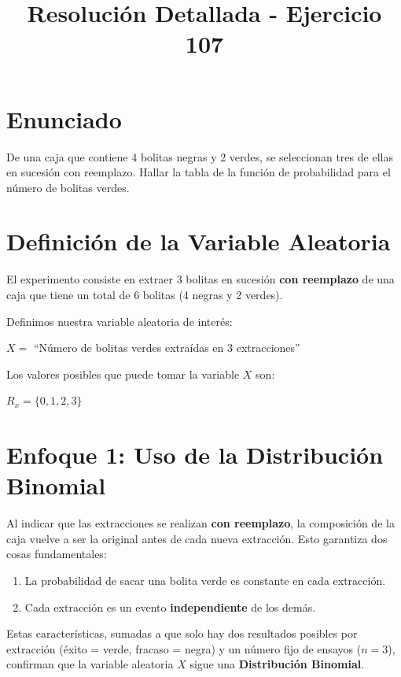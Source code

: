 \documentclass[a4paper,12pt]{article}
\title{\textbf{Resolución Detallada - Ejercicio 107}}
\author{}
\date{}
\begin{document}
\maketitle

\section*{Enunciado}
De una caja que contiene 4 bolitas negras y 2 verdes, se seleccionan tres de ellas en sucesión con reemplazo. Hallar la tabla de la función de probabilidad para el número de bolitas verdes.

\vspace{0.5cm}

\section*{Definición de la Variable Aleatoria}
El experimento consiste en extraer 3 bolitas en sucesión \textbf{con reemplazo} de una caja que tiene un total de 6 bolitas (4 negras y 2 verdes).

Definimos nuestra variable aleatoria de interés:
\begin{center}
    $X =$ ``Número de bolitas verdes extraídas en 3 extracciones''
\end{center}

Los valores posibles que puede tomar la variable $X$ son:
\begin{center}
    $R_x = \{0, 1, 2, 3\}$
\end{center}

\vspace{0.5cm}

\section*{Enfoque 1: Uso de la Distribución Binomial}
Al indicar que las extracciones se realizan \textbf{con reemplazo}, la composición de la caja vuelve a ser la original antes de cada nueva extracción. Esto garantiza dos cosas fundamentales:
\begin{enumerate}
    \item La probabilidad de sacar una bolita verde es constante en cada extracción.
    \item Cada extracción es un evento \textbf{independiente} de los demás.
\end{enumerate}

Estas características, sumadas a que solo hay dos resultados posibles por extracción (éxito = verde, fracaso = negra) y un número fijo de ensayos ($n=3$), confirman que la variable aleatoria $X$ sigue una \textbf{Distribución Binomial}.
\end{document}

